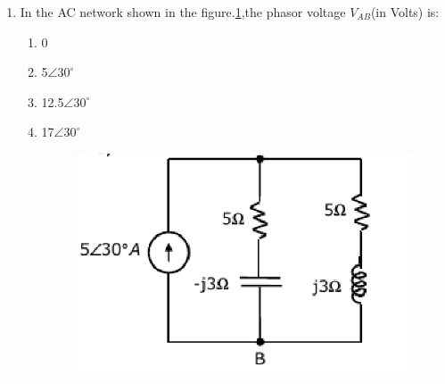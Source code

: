 \documentclass[journal,12pt,twocolumn]{IEEEtran}
\begin{document}
\begin{enumerate}
\item In the AC network shown in the figure.\ref{fig69},the phasor voltage $V_{AB}$(in Volts) is:
\begin{enumerate}
\setlength\itemsep{2em}
\item 0
\item 5$\angle30 ^\circ$
\item 12.5$\angle30^\circ$
\item 17$\angle30^\circ$
\begin{figure}[!h]
\begin{center}
\includegraphics[scale=0.8]{./figs/fig69.eps}
\caption{}
\label{fig69}
\end{center}
\end{figure}
\end{enumerate}



\end{enumerate}
\end{document}
